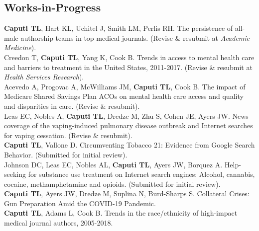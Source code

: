 \documentclass[11pt, letterpaper]{article}
\begin{document}
\subsection*{Works-in-Progress}
\noindent
\textbf{Caputi TL}, Hart KL, Uchitel J, Smith LM, Perlis RH. The persistence of all-male authorship teams in top medical journals. (Revise \& resubmit at \emph{Academic Medicine}).\\[.2cm]
Creedon T, \textbf{Caputi TL}, Yang K, Cook B. Trends in access to mental health care and barriers to treatment in the United States, 2011-2017. (Revise \& resubmit at \emph{Health Services Research}).\\[.2cm]
Acevedo A, Progovac A, McWilliams JM, \textbf{Caputi TL}, Cook B. The impact of Medicare Shared Savings Plan ACOs on mental health care access and quality and disparities in care. (Revise \& resubmit).\\[.2cm]
Leas EC, Nobles A, \textbf{Caputi TL}, Dredze M, Zhu S, Cohen JE, Ayers JW. News coverage of the vaping-induced pulmonary disease outbreak and Internet searches for vaping cessation. (Revise \& resubmit).\\[.2cm]
\textbf{Caputi TL}, Vallone D. Circumventing Tobacco 21: Evidence from Google Search Behavior. (Submitted for initial review).\\[.2cm]
Johnson DC, Leas EC, Nobles AL, \textbf{Caputi TL}, Ayers JW, Borquez A. Help-seeking for substance use treatment on Internet search engines: Alcohol, cannabis, cocaine, methamphetamine and opioids. (Submitted for initial review).\\[.2cm]
\textbf{Caputi TL}, Ayers JW, Dredze M, Suplina N, Burd-Sharps S. Collateral Crises: Gun Preparation Amid the COVID-19 Pandemic.\\[.2cm]
\textbf{Caputi TL}, Adams L, Cook B. Trends in the race/ethnicity of high-impact medical journal authors, 2005-2018.\\[.2cm]
\end{document}
